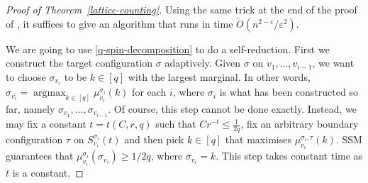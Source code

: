 \documentclass{theoretics}
\newcommand{\eps}{\varepsilon}
\newcommand{\argmax}{\operatorname{argmax}}
\begin{document}
\begin{proof}[Proof of Theorem~\ref{lattice-counting}]
  Using the same trick at the end of the proof of ,
  it suffices to give an algorithm that runs in time $\widetilde{O}(n^{2-c}/\eps^2)$.

  We are going to use \eqref{q-spin-decomposition} to do a self-reduction.
  First we construct the target configuration $\sigma$ adaptively.
  Given $\sigma$ on $v_1,\ldots,v_{i-1}$,
  we want to choose $\sigma_{v_i}$ to be $k\in [q]$ with the largest marginal.
  In other words, $\sigma_{v_i}=\argmax_{k\in[q]}\mu_{v_i}^{\sigma_i}(k)$ for each $i$,
  where $\sigma_i$ is what has been constructed so far, namely $\sigma_{v_1},\ldots,\sigma_{v_{i-1}}$.
  Of course, this step cannot be done exactly.
  Instead, we may fix a constant $t = t(C,r,q)$ such that $Cr^{-t} \leq \frac{1}{2q}$, fix an arbitrary boundary  configuration $\tau$ on $S^{\sigma_i}_{v_i}(t)$ and then pick $k\in[q]$ that maximises $\mu^{\sigma_i,\tau}_{v_i}(k)$.
  SSM guarantees that
  $\mu_{v_i}^{\sigma_i}(\sigma_{v_i})\ge 1/2q$, where $\sigma_{v_i} = k$.
  This step takes constant time as $t$ is a constant.


\end{proof}
\end{document}
